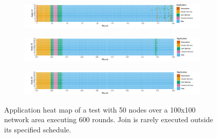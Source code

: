 \begin{figure}[H]
    \centering
    \begin{subfigure}{\textwidth}
        \centering
        \includegraphics[width=\textwidth]{figure/Results/ReliabilityDiscussionApplicationHeatmaps/applicationmap50x50_1.pdf}
        \label{subfig:application-map-50-nodes-round-1-199}
    \end{subfigure}
    \hfill
    \begin{subfigure}{\textwidth}
        \centering
        \includegraphics[width=\textwidth]{figure/Results/ReliabilityDiscussionApplicationHeatmaps/applicationmap50x50_2.pdf}
        \label{subfig:application-map-50-nodes-round-200-399}
    \end{subfigure}
    \begin{subfigure}{\textwidth}
        \centering
        \includegraphics[width=\textwidth]{figure/Results/ReliabilityDiscussionApplicationHeatmaps/applicationmap50x50_3.pdf}
        \label{subfig:application-map-50-nodes-round-400-599}
    \end{subfigure}
    \caption{Application heat map of a test with 50 nodes over a 100x100 network area executing 600 rounds. Join is rarely executed outside its specified schedule.}
    \label{fig:application-map-50-nodes}
\end{figure}